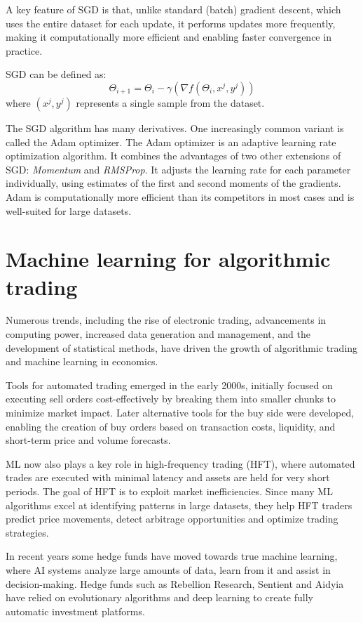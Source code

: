 \documentclass[a4paper,oneside,onecolumn,12pt]{book}
\begin{document}
		A key feature of SGD is that, unlike standard (batch) gradient descent, which uses the entire dataset for each update, it performs updates more frequently, making it computationally more efficient and enabling faster convergence in practice. \cite{COOTMLT}

		SGD can be defined as:
		\[ \Theta_{i+1} = \Theta_{i} - \gamma (\nabla f(\Theta_i, x^j, y^j)) \]
		where $(x^j, y^j)$ represents a single sample from the dataset. \cite{SGD} 

		The SGD algorithm has many derivatives. One increasingly common variant is called the Adam optimizer. The Adam optimizer is an adaptive learning rate optimization algorithm. It combines the advantages of two other extensions of SGD: \textit{Momentum} and \textit{RMSProp}. It adjusts the learning rate for each parameter individually, using estimates of the first and second moments of the gradients. Adam is computationally more efficient than its competitors in most cases and is well-suited for large datasets. \cite{AO} 

\section{Machine learning for algorithmic trading}
	Numerous trends, including the rise of electronic trading, advancements in computing power, increased data generation and management, and the development of statistical methods, have driven the growth of algorithmic trading and machine learning in economics.

	Tools for automated trading emerged in the early 2000s, initially focused on executing sell orders cost-effectively by breaking them into smaller chunks to minimize market impact. Later alternative tools for the buy side were developed, enabling the creation of buy orders based on transaction costs, liquidity, and short-term price and volume forecasts.

	ML now also plays a key role in high-frequency trading (HFT), where automated trades are executed with minimal latency and assets are held for very short periods. The goal of HFT is to exploit market inefficiencies. Since many ML algorithms excel at identifying patterns in large datasets, they help HFT traders predict price movements, detect arbitrage opportunities and optimize trading strategies.

	In recent years some hedge funds have moved towards true machine learning, where AI systems analyze large amounts of data, learn from it and assist in decision-making. Hedge funds such as Rebellion Research, Sentient and Aidyia have relied on evolutionary algorithms and deep learning to create fully automatic investment platforms.
\end{document}
